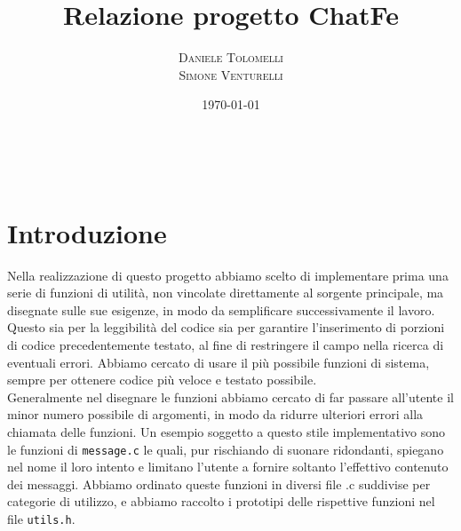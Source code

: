 \documentclass[a4paper, 11pt]{article} %
\title{\textbf{Relazione progetto ChatFe} }
\author{\textsc{Daniele Tolomelli \\ Simone Venturelli}} %
\date{\today} %
\makeatletter
\renewcommand{\maketitle}{ %
\begin{flushright} %
{\LARGE\@title} %

\vspace{50pt} %

{\large\@author} %
\\\@date %

\vspace{40pt} %
\end{flushright}
}
\makeatother
\begin{document}
\maketitle %


\section*{Introduzione}

Nella realizzazione di questo progetto abbiamo scelto di implementare prima una serie di funzioni di utilità, non vincolate direttamente al sorgente principale, ma disegnate sulle sue esigenze, in modo da semplificare successivamente il lavoro. Questo sia per la leggibilità del codice sia per garantire l'inserimento di porzioni di codice precedentemente testato, al fine di restringere il campo nella ricerca di eventuali errori. Abbiamo cercato di usare il più possibile funzioni di sistema, sempre per ottenere codice più veloce e testato possibile.\\ 
Generalmente nel disegnare le funzioni abbiamo cercato di far passare all'utente il minor numero possibile di argomenti, in modo da ridurre ulteriori errori alla chiamata delle funzioni. Un esempio soggetto a questo stile implementativo sono le funzioni di \texttt{message.c} le quali, pur rischiando di suonare ridondanti, spiegano nel nome il loro intento e limitano l'utente a fornire soltanto l'effettivo contenuto dei messaggi. 
Abbiamo ordinato queste funzioni in diversi file .c suddivise per categorie di utilizzo, e abbiamo raccolto i prototipi delle rispettive funzioni nel file \texttt{utils.h}.\\
\end{document}
